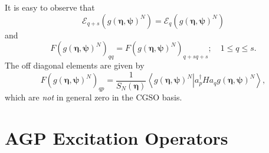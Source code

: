 \documentclass[aps,preprint]{revtex4}%
\begin{document}
It is easy to observe that
\begin{equation}
\mathcal{E}_{q+s}\left(  g\left(  \mathbf{\eta},\mathbf{\psi}\right)
^{N}\right)  =\mathcal{E}_{q}\left(  g\left(  \mathbf{\eta},\mathbf{\psi
}\right)  ^{N}\right)
\end{equation}
and
\begin{equation}
F\left(  g\left(  \mathbf{\eta},\mathbf{\psi}\right)  ^{N}\right)
_{qq}=F\left(  g\left(  \mathbf{\eta},\mathbf{\psi}\right)  ^{N}\right)
_{q+sq+s};\quad1\leq q\leq s.
\end{equation}
The off diagonal elements are given by
\begin{equation}
F\left(  g\left(  \mathbf{\eta},\mathbf{\psi}\right)  ^{N}\right)  _{qp}%
=\frac{1}{S_{N}\left(  \mathbf{\eta}\right)  }\left\langle \left.  g\left(
\mathbf{\eta},\mathbf{\psi}\right)  ^{N}\right\vert a_{p}^{\dagger}%
Ha_{q}g\left(  \mathbf{\eta},\mathbf{\psi}\right)  ^{N}\right\rangle ,
\end{equation}
which are \emph{not }in general zero in the CGSO basis.  

\section{AGP Excitation Operators\label{q_op}}
\end{document}
